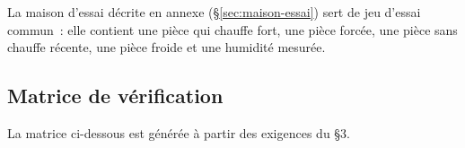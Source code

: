 La maison d'essai décrite en annexe (§\ref{sec:maison-essai}) sert de jeu d'essai commun~:
elle contient une pièce qui chauffe fort, une pièce forcée, une pièce sans chauffe récente,
une pièce froide et une humidité mesurée.


\subsection{Matrice de vérification}

La matrice ci-dessous est générée à partir des exigences du §3.

\matriceverification
